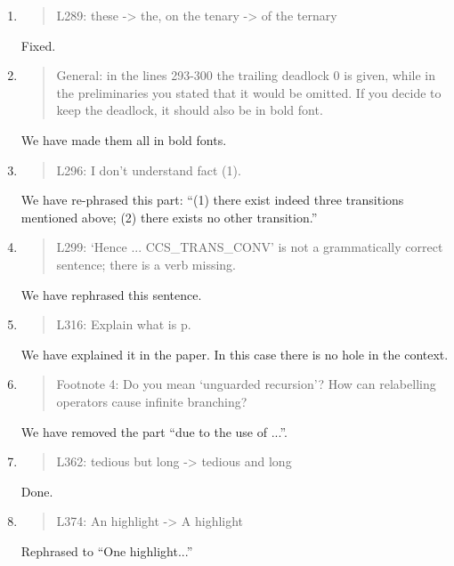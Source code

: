 \begin{enumerate}
\item \begin{quote}
    L289: these -> the, on the tenary -> of the ternary
  \end{quote}
  \Mark
  Fixed.
  
\item \begin{quote}
    General: in the lines 293-300 the trailing deadlock 0 is given,
    while in the preliminaries you stated that it would be omitted. If
    you decide to keep the deadlock, it should also be in bold font.
  \end{quote}
  \Mark
  We have made them all in bold fonts.
  
\item \begin{quote}
    L296: I don’t understand fact (1).
  \end{quote}
  \Mark
 We have re-phrased this part: ``(1) there exist indeed three
  transitions mentioned above; (2) there exists no other
  transition.''
  
\item \begin{quote}
    L299: ‘Hence ... CCS_TRANS_CONV’ is not a grammatically correct sentence; there is a verb missing.
  \end{quote}
   \Mark
 We have rephrased this sentence.

\item \begin{quote}
    L316: Explain what is p.
  \end{quote}
  \Mark
  We have explained it in the paper. In this case there is no hole in the context.
  
\item \begin{quote}
    Footnote 4: Do you mean ‘unguarded recursion’? How can relabelling operators cause infinite branching?
  \end{quote}
  \Mark
  We have removed the part ``due to the use of ...''. 
  
\item \begin{quote}
    L362: tedious but long -> tedious and long
  \end{quote}
  \Mark
  Done.
  
\item \begin{quote}
    L374: An highlight -> A highlight
  \end{quote}
  \Mark
  Rephrased to ``One highlight...''
  

\end{enumerate}
